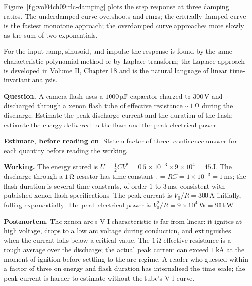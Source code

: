 

Figure~\ref{fig:vol04ch09:rlc-damping} plots the step response at three
damping ratios. The underdamped curve overshoots and rings; the
critically damped curve is the fastest monotone approach; the
overdamped curve approaches more slowly as the sum of two exponentials.

For the input ramp, sinusoid, and impulse the response is found by
the same characteristic-polynomial method or by Laplace transform;
the Laplace approach is developed in Volume II, Chapter 18 and is the
natural language of linear time-invariant analysis.

\begin{estimation}
\textbf{Question.} A camera flash uses a $1000\,\si{\micro\farad}$
capacitor charged to $300\,\si{\volt}$ and discharged through a xenon
flash tube of effective resistance $\sim 1\,\si{\ohm}$ during the
discharge. Estimate the peak discharge current and the duration of
the flash; estimate the energy delivered to the flash and the peak
electrical power.

\textbf{Estimate, before reading on.} State a factor-of-three-
confidence answer for each quantity before reading the working.

\textbf{Working.} The energy stored is $U = \tfrac{1}{2}CV^{2} =
0.5\times 10^{-3}\times 9\times 10^{4} = 45\,\si{\joule}$. The
discharge through a $1\,\si{\ohm}$ resistor has time constant
$\tau = RC = 1\times 10^{-3} = 1\,\si{\milli\second}$; the flash
duration is several time constants, of order $1$ to $3\,\si{\milli
\second}$, consistent with published xenon-flash specifications. The
peak current is $V_{0}/R = 300\,\si{\ampere}$ initially, falling
exponentially. The peak electrical power is $V_{0}^{2}/R = 9\times
10^{4}\,\si{\watt} = 90\,\si{\kilo\watt}$.

\textbf{Postmortem.} The xenon arc's V-I characteristic is far from
linear: it ignites at high voltage, drops to a low arc voltage during
conduction, and extinguishes when the current falls below a critical
value. The $1\,\si{\ohm}$ effective resistance is a rough average
over the discharge; the actual peak current can exceed $1\,\si{\kilo
\ampere}$ at the moment of ignition before settling to the arc
regime. A reader who guessed within a factor of three on energy and
flash duration has internalised the time scale; the peak current is
harder to estimate without the tube's V-I curve.
\end{estimation}

